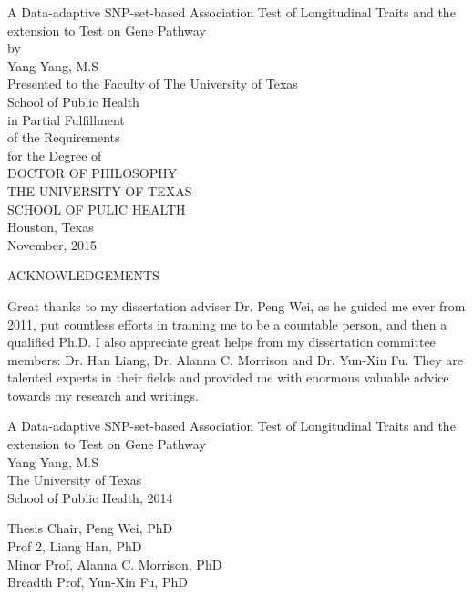 \documentclass[12pt]{article}
\begin{document}
\newpage
\thispagestyle{empty}
\doublespacing
\begin{center}
{\normalsize A Data-adaptive SNP-set-based Association Test of Longitudinal Traits and the extension to Test on Gene Pathway}\\[3.2cm]

by\\[0.5cm]

Yang Yang, M.S\\[3.2cm]

Presented to the Faculty of The University of Texas\\
School of Public Health\\
in Partial Fulfillment\\
of the Requirements\\
for the Degree of\\[1.5cm]
DOCTOR OF PHILOSOPHY\\[1.5cm]
\singlespacing
THE UNIVERSITY OF TEXAS\\
SCHOOL OF PULIC HEALTH\\
Houston, Texas\\
November, 2015
\end{center}


\newpage
\thispagestyle{empty}
\doublespacing
\begin{center}
ACKNOWLEDGEMENTS
\end{center}
Great thanks to my dissertation adviser Dr. Peng Wei, as he guided me ever from 2011, put countless efforts in training me to be a countable person, and then a qualified Ph.D. I also appreciate great helps from my dissertation committee members: Dr. Han Liang, Dr. Alanna C. Morrison and Dr. Yun-Xin Fu. They are talented experts in their fields and provided me with enormous valuable advice towards my research and writings.


\newpage
\thispagestyle{empty}
\doublespacing
\begin{center}
{\normalsize  A Data-adaptive SNP-set-based Association Test of Longitudinal Traits and the extension to Test on Gene Pathway}\\[2.3cm]
\singlespacing
Yang Yang, M.S\\
The University of Texas\\
School of Public Health, 2014
\end{center}

\doublespacing
\noindent
Thesis Chair, Peng Wei, PhD\\
\indent
Prof 2, Liang Han, PhD\\
Minor Prof, Alanna C. Morrison, PhD\\ 
Breadth Prof, Yun-Xin Fu, PhD
\end{document}
